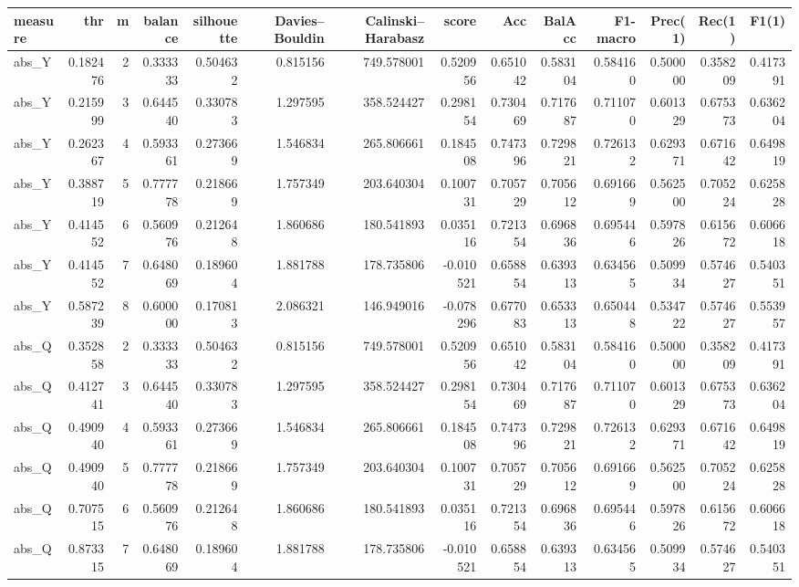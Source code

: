 \begin{tabular}{lrrrrrrrrrrrrr}
\toprule
measure & thr & m & balance & silhouette & Davies--Bouldin & Calinski--Harabasz & score & Acc & BalAcc & F1-macro & Prec(1) & Rec(1) & F1(1) \\
\midrule
abs\_Y & 0.182476 & 2 & 0.333333 & 0.504632 & 0.815156 & 749.578001 & 0.520956 & 0.651042 & 0.583104 & 0.584160 & 0.500000 & 0.358209 & 0.417391 \\
abs\_Y & 0.215999 & 3 & 0.644540 & 0.330783 & 1.297595 & 358.524427 & 0.298154 & 0.730469 & 0.717687 & 0.711070 & 0.601329 & 0.675373 & 0.636204 \\
abs\_Y & 0.262367 & 4 & 0.593361 & 0.273669 & 1.546834 & 265.806661 & 0.184508 & 0.747396 & 0.729821 & 0.726132 & 0.629371 & 0.671642 & 0.649819 \\
abs\_Y & 0.388719 & 5 & 0.777778 & 0.218669 & 1.757349 & 203.640304 & 0.100731 & 0.705729 & 0.705612 & 0.691669 & 0.562500 & 0.705224 & 0.625828 \\
abs\_Y & 0.414552 & 6 & 0.560976 & 0.212648 & 1.860686 & 180.541893 & 0.035116 & 0.721354 & 0.696836 & 0.695446 & 0.597826 & 0.615672 & 0.606618 \\
abs\_Y & 0.414552 & 7 & 0.648069 & 0.189604 & 1.881788 & 178.735806 & -0.010521 & 0.658854 & 0.639313 & 0.634565 & 0.509934 & 0.574627 & 0.540351 \\
abs\_Y & 0.587239 & 8 & 0.600000 & 0.170813 & 2.086321 & 146.949016 & -0.078296 & 0.677083 & 0.653313 & 0.650448 & 0.534722 & 0.574627 & 0.553957 \\
abs\_Q & 0.352858 & 2 & 0.333333 & 0.504632 & 0.815156 & 749.578001 & 0.520956 & 0.651042 & 0.583104 & 0.584160 & 0.500000 & 0.358209 & 0.417391 \\
abs\_Q & 0.412741 & 3 & 0.644540 & 0.330783 & 1.297595 & 358.524427 & 0.298154 & 0.730469 & 0.717687 & 0.711070 & 0.601329 & 0.675373 & 0.636204 \\
abs\_Q & 0.490940 & 4 & 0.593361 & 0.273669 & 1.546834 & 265.806661 & 0.184508 & 0.747396 & 0.729821 & 0.726132 & 0.629371 & 0.671642 & 0.649819 \\
abs\_Q & 0.490940 & 5 & 0.777778 & 0.218669 & 1.757349 & 203.640304 & 0.100731 & 0.705729 & 0.705612 & 0.691669 & 0.562500 & 0.705224 & 0.625828 \\
abs\_Q & 0.707515 & 6 & 0.560976 & 0.212648 & 1.860686 & 180.541893 & 0.035116 & 0.721354 & 0.696836 & 0.695446 & 0.597826 & 0.615672 & 0.606618 \\
abs\_Q & 0.873315 & 7 & 0.648069 & 0.189604 & 1.881788 & 178.735806 & -0.010521 & 0.658854 & 0.639313 & 0.634565 & 0.509934 & 0.574627 & 0.540351 \\

\end{tabular}
